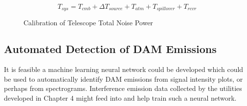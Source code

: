 %
\begin{figure}[here]
	\centering
	\begin{equation}
	T_{sys} = T_{cmb} + \Delta{T_{source}} + T_{atm} + T_{spillover} + T_{rcvr}
	\end{equation}
	\caption{Calibration of Telescope Total Noise Power}
	\label{fig:telescope_calibration}
\end{figure}
%

\subsection*{Automated Detection of DAM Emissions}

It is feasible a machine learning neural network could be developed which could be used to automatically identify \gls{DAM} emissions from signal intensity plots, or perhaps from spectrograms. Interference emission data collected by the utilities developed in Chapter 4 might feed into and help train such a neural network.

